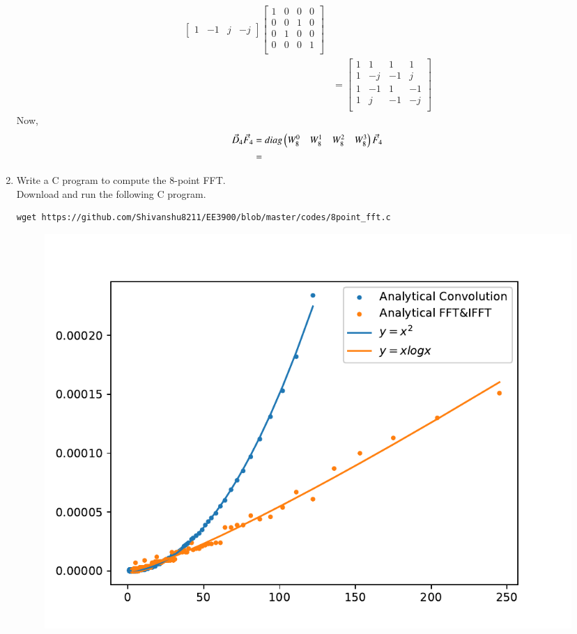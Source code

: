 \documentclass[journal,12pt,twocolumn]{IEEEtran}
\renewcommand\thesection{\arabic{section}}
\begin{document}
\begin{enumerate}[label=\arabic*.,ref=\thesection.\theenumi]
\begin{align}
\begin{bmatrix}
                                  1 & -1 & j  & -j
                             \end{bmatrix}\begin{bmatrix}
                                               1 & 0 & 0 & 0 \\
                                               0 & 0 & 1 & 0 \\
                                               0 & 1 & 0 & 0 \\
                                               0 & 0 & 0 & 1 \\
                                          \end{bmatrix}           \\
                          & =\begin{bmatrix}
                                  1 & 1  & 1  & 1  \\
                                  1 & -j & -1 & j  \\
                                  1 & -1 & 1  & -1 \\
                                  1 & j  & -1 & -j \\
                             \end{bmatrix}
           \end{align}
           Now,
           \begin{align}
                \vec{D}_{4}\vec{F}_{4} & =diag\begin{pmatrix}W_{8}^{0} & W_{8}^{1} & W_{8}^{2} & W_{8}^{3}\end{pmatrix}\vec{F}_{4} \\
                                       & =
           \end{align}
     \item Write a C program to compute the 8-point FFT. \\
           \solution Download and run the following C program.
           \begin{lstlisting}
wget https://github.com/Shivanshu8211/EE3900/blob/master/codes/8point_fft.c
           \end{lstlisting}
           \begin{figure}[!ht]
               \centering
               \includegraphics[width=\columnwidth]{./figs/time-eps-converted-to.pdf}

\end{figure}
\end{enumerate}
\end{document}
